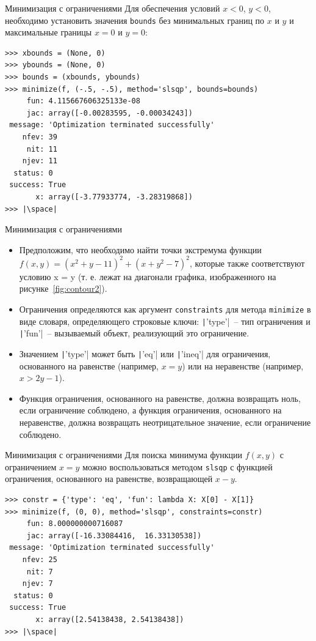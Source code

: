 \documentclass[aspectratio=169, mathserif]{beamer}	%
\begin{document}
\begin{frame}[fragile]{Минимизация с ограничениями}
\scriptsize
Для обеспечения условий $x < 0$, $y < 0$, необходимо установить значения \texttt{bounds} без минимальных границ по $x$ и $y$ и максимальные границы $x = 0$ и $y = 0$:
\vfill
\begin{verbatim}
>>> xbounds = (None, 0)
>>> ybounds = (None, 0)
>>> bounds = (xbounds, ybounds)
>>> minimize(f, (-.5, -.5), method='slsqp', bounds=bounds)
     fun: 4.115667606325133e-08
     jac: array([-0.00283595, -0.00034243])
 message: 'Optimization terminated successfully'
    nfev: 39
     nit: 11
    njev: 11
  status: 0
 success: True
       x: array([-3.77933774, -3.28319868])
>>> |\space|
\end{verbatim}
\vfill
\end{frame}


\begin{frame}[fragile]{Минимизация с ограничениями}
\scriptsize
\begin{itemize}
\item Предположим, что необходимо найти точки экстремума функции $f\left(x, y\right) = \left(x^2 + y - 11\right)^2 + \left(x + y^2 - 7\right)^2$, которые также соответствуют условию x = y (т. е. лежат на диагонали графика, изображенного на рисунке~\ref{fig:contour2}).
\item Ограничения определяются как аргумент \texttt{constraints} для метода \texttt{minimize} в виде словаря, определяющего строковые ключи: \texttt|'type'|~-- тип ограничения и \texttt|'fun'|~-- вызываемый объект, реализующий это ограничение.
\item Значением \texttt|'type'| может быть \texttt|'eq'| или \texttt|'ineq'| для ограничения, основанного на равенстве (например, $x = y$) или на неравенстве (например, $x > 2y - 1$).
\item Функция ограничения, основанного на равенстве, должна возвращать ноль, если ограничение соблюдено, а функция ограничения, основанного на неравенстве, должна возвращать неотрицательное значение, если ограничение соблюдено.
\end{itemize}
\vfill
\end{frame}


\begin{frame}[fragile]{Минимизация с ограничениями}
\scriptsize
Для поиска минимума функции $f(x, y)$ с ограничением $x = y$ можно воспользоваться методом \texttt{slsqp} с функцией ограничения, основанного на равенстве, возвращающей $x - y$.
\vfill
\begin{verbatim}
>>> constr = {'type': 'eq', 'fun': lambda X: X[0] - X[1]}
>>> minimize(f, (0, 0), method='slsqp', constraints=constr)
     fun: 8.000000000716087
     jac: array([-16.33084416,  16.33130538])
 message: 'Optimization terminated successfully'
    nfev: 25
     nit: 7
    njev: 7
  status: 0
 success: True
       x: array([2.54138438, 2.54138438])
>>> |\space|
\end{verbatim}
\vfill
\end{frame}
\end{document}
